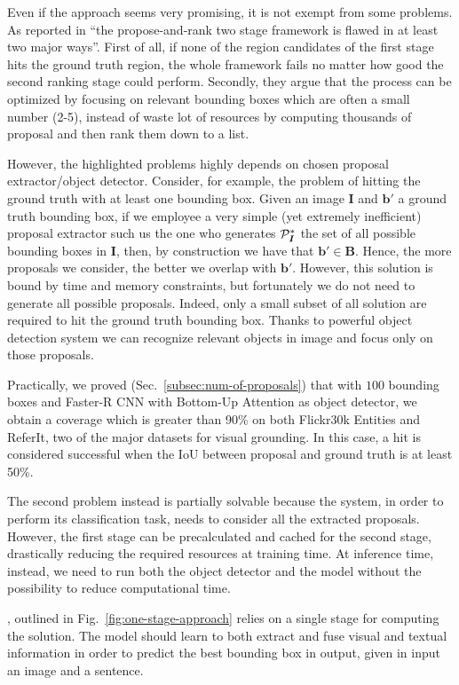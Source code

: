 Even if the approach seems very promising, it is not exempt from some
problems. As reported in \cite{yang2019fast} ``the propose-and-rank
two stage framework is flawed in at least two major ways''. First of
all, if none of the region candidates of the first stage hits the
ground truth region, the whole framework fails no matter how good the
second ranking stage could perform. Secondly, they argue that the
process can be optimized by focusing on relevant bounding boxes which
are often a small number (2-5), instead of waste lot of resources by
computing thousands of proposal and then rank them down to a list.

However, the highlighted problems highly depends on chosen proposal
extractor/object detector. Consider, for example, the problem of
hitting the ground truth with at least one bounding box. Given an
image $\bm{I}$ and $\bm{b}'$ a ground truth bounding box, if we
employee a very simple (yet extremely inefficient) proposal extractor
such us the one who generates $\mathcal{P}^*_{\bm{I}}$ the set of all
possible bounding boxes in $\bm{I}$, then, by construction we have
that $\bm{b}' \in \bm{B}$. Hence, the more proposals we consider, the
better we overlap with $\bm{b}'$. However, this solution is bound by
time and memory constraints, but fortunately we do not need to
generate all possible proposals. Indeed, only a small subset of all
solution are required to hit the ground truth bounding box. Thanks to
powerful object detection system we can recognize relevant objects in
image and focus only on those proposals.

Practically, we proved (Sec.~\ref{subsec:num-of-proposals}) that with
$100$ bounding boxes and Faster-R CNN with Bottom-Up Attention
\cite{sharma2020understanding} as object detector, we obtain a
coverage which is greater than 90\% on both Flickr30k Entities and
ReferIt, two of the major datasets for visual grounding. In this case,
a hit is considered successful when the IoU between proposal and
ground truth is at least 50\%.

The second problem instead is partially solvable because the system,
in order to perform its classification task, needs to consider all the
extracted proposals. However, the first stage can be precalculated and
cached for the second stage, drastically reducing the required
resources at training time. At inference time, instead, we need to run
both the object detector and the model without the possibility to
reduce computational time.

, outlined in
Fig.~\ref{fig:one-stage-approach} relies on a single stage for
computing the solution. The model should learn to both extract and
fuse visual and textual information in order to predict the best
bounding box in output, given in input an image and a sentence. 

